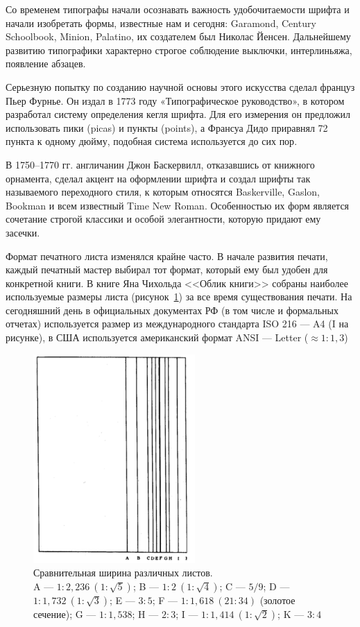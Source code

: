 Со временем типографы начали осознавать важность удобочитаемости шрифта и начали изобретать формы, известные нам и сегодня:  Garamond, Century Schoolbook, Minion, Palatino, их создателем был Николас Йенсен. Дальнейшему развитию типографики характерно строгое соблюдение выключки, интерлиньяжа, появление абзацев\cite{about_font}.

Серьезную попытку по созданию научной основы этого искусства сделал француз Пьер Фурнье. Он издал в 1773 году «Типографическое руководство», в котором разработал систему определения кегля шрифта. Для его измерения он предложил использовать пики (picas) и пункты (points), а Франсуа Дидо приравнял 72 пункта к одному дюйму, подобная система используется до сих пор\cite{gordon_aboutletters}.

В 1750--1770 гг. англичанин Джон Баскервилл, отказавшись от книжного орнамента, сделал акцент на оформлении шрифта и создал шрифты так называемого переходного стиля, к которым относятся Baskerville, Gaslon, Bookman и всем известный Time New Roman. Особенностью их форм является сочетание строгой классики и особой элегантности, которую придают ему засечки.

Формат печатного листа изменялся крайне часто. В начале развития печати, каждый печатный мастер выбирал тот формат, который ему был удобен для конкретной книги. В книге Яна Чихольда <<Облик книги>>\cite{tschichold_image} собраны наиболее используемые размеры листа (рисунок~\ref{fig:formats}) за все время существования печати. На сегодняшний день в официальных документах РФ (в том числе и формальных отчетах) используется размер из международного стандарта ISO 216 --- A4 (I на рисунке)\cite{GOST732}, в США используется американский формат ANSI --- Letter ($\approx 1:1,3$)

\begin{figure}[H]
	\centering
	\includegraphics[width=0.55\textwidth]{pics/formats.png}
	\caption{Сравнительная ширина различных листов.\\
		A --- $1:2,236\ (1:\sqrt{5})$;
		B --- $1:2\ (1:\sqrt{4})$;
		C --- $5/9$;
		D --- $1:1,732\ (1:\sqrt{3})$;
		E --- $3:5$;
		F --- $1:1,618\ (21:34)$ (золотое сечение);
		G --- $1:1,538$;
		H --- $2:3$;
		I --- $1:1,414\ (1:\sqrt{2})$;
		K --- $3:4$
	}
	\label{fig:formats}
\end{figure}

